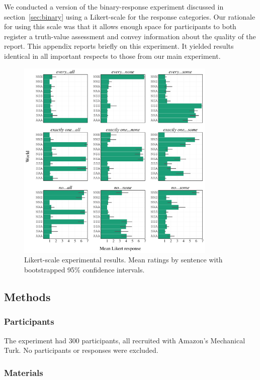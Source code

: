 \documentclass[leqno,12pt]{article}
\newcommand{\secref}[1]{section~\ref{#1}}
\begin{document}
{\begin{appendix}
We conducted a version of the binary-response experiment discussed in
\secref{sec:binary} using a Likert-scale for the response categories.
Our rationale for using this scale was that it allows enough space for
participants to both register a truth-value assessment and convey
information about the quality of the report. This appendix reports
briefly on this experiment. It yielded results identical in all
important respects to those from our main experiment.

\begin{figure}[t]
  \centering
  \includegraphics[width=0.85\textwidth]{embeddedscalars-experiment-results-likert}
  \caption{Likert-scale experimental results. Mean ratings by sentence with bootstrapped 95\% confidence intervals.}
  \label{fig:likert:results}
\end{figure}

\subsection{Methods}

\subsubsection{Participants}

The experiment had 300 participants, all recruited with Amazon's
Mechanical Turk. No participants or responses were excluded.

\subsubsection{Materials}


\end{appendix}}
\end{document}
